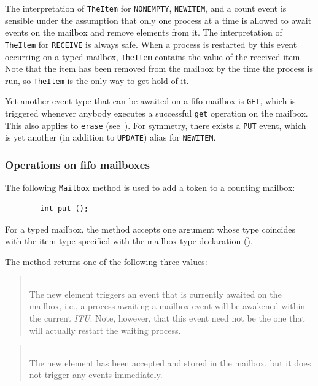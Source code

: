 \medskip

The interpretation of {\tt TheItem} for {\tt NONEMPTY},
{\tt NEWITEM}, and a count event is sensible under the assumption that
only one process at a time
is allowed to await events on the mailbox and remove elements from it.
The interpretation of {\tt TheItem} for {\tt RECEIVE} is always safe.
When a process is restarted by this event occurring on a typed mailbox,
{\tt TheItem} contains the value of the received item.
Note that the item has been removed from the mailbox by the time the
process is run, so {\tt TheItem} is the only way to get hold of it.

Yet another event type that can be awaited on a fifo mailbox is {\tt GET},
which is triggered whenever anybody
executes a successful {\tt get} operation on the mailbox.
This also applies to {\tt erase} (see~).
For symmetry, there exists a {\tt PUT} event, which is yet another
(in addition to {\tt UPDATE}) alias for
{\tt NEWITEM}.

\subsubsection{Operations on fifo mailboxes}
\label{rm_mb_fi_op}

The following {\tt Mailbox} method is used to add a token to a counting
mailbox:
\begin{verbatim}
        int put ();
\end{verbatim}
For a typed mailbox, the method accepts one argument whose type coincides
with the item type specified with the mailbox type declaration
().

The method returns one of
the following three values:

\medskip

\begin{quote}
\noindent{}\\ \hspace{0in}
The new element triggers an event that is currently
awaited on the mailbox, i.e., a process awaiting a mailbox event
will be awakened within the current {\em ITU}.
Note, however, that this event need not be the one that will
actually restart the waiting process.
\end{quote}

\begin{quote}
\noindent{}\\ \hspace{0in}
The new element has been accepted and stored in the mailbox, but
it does not trigger any events immediately.
\end{quote}


